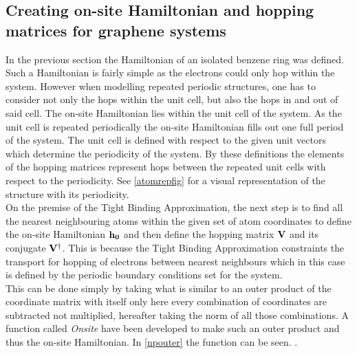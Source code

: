 \subsection{Creating on-site Hamiltonian and hopping matrices for graphene systems}
In the previous section the Hamiltonian of an isolated benzene ring was defined. Such a Hamiltonian is fairly simple as the electrons could only hop within the system. However when modelling repeated periodic structures, one has to consider not only the hops within the unit cell, but also the hops in and out of said cell.
The on-site Hamiltonian lies within the unit cell of the system. As the unit cell is repeated periodically the on-site Hamiltonian fills out one full period of the system. The unit cell is defined with respect to the given unit vectors which determine the periodicity of the system. By these definitions the elements of the hopping matrices represent hops between the repeated unit cells with respect to the periodicity. See \cref{atomrepfig} for a visual representation of the structure with its periodicity. \\
On the premise of the Tight Binding Approximation, the next step is to find all the nearest neighbouring atoms within the given set of atom coordinates to define the on-site Hamiltonian \(\bf{h}_0\) and then define the hopping matrix \(\bf{V}\) and its conjugate \(\bf{V}^{\dagger}\). This is because the Tight Binding Approximation constraints the  transport for hopping of electrons between nearest neighbours which in this case is defined by the periodic boundary conditions set for the system.\\ This can be done simply by taking what is similar to an outer product of the coordinate matrix with itself only here every combination of coordinates are subtracted not multiplied, hereafter taking the norm of all those combinations. A function called \textit{Onsite} have been developed to make such an outer product and thus the on-site Hamiltonian. In \cref{npouter} the function can be seen.
.
\vspace{-1\baselineskip}
\vspace{\baselineskip}
